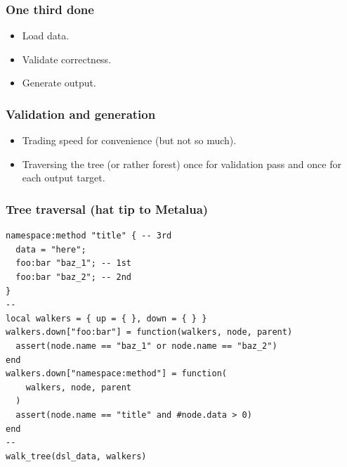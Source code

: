 \documentclass[handout]{beamer}
\begin{document}

\begin{frame}

\frametitle{One third done}

\begin{itemize}
\item[\checkmark] Load data.
\item Validate correctness.
\item Generate output.
\end{itemize}

\end{frame}


\begin{frame}

\frametitle{Validation and generation}

\begin{itemize}
\item Trading speed for convenience (but not so much).
\item Traversing the tree (or rather forest) once for validation pass
      and once for each output target.
\end{itemize}

\end{frame}


\begin{frame}[fragile]

\frametitle{Tree traversal (hat tip to Metalua)}

\begin{verbatim}
namespace:method "title" { -- 3rd
  data = "here";
  foo:bar "baz_1"; -- 1st
  foo:bar "baz_2"; -- 2nd
}
--
local walkers = { up = { }, down = { } }
walkers.down["foo:bar"] = function(walkers, node, parent)
  assert(node.name == "baz_1" or node.name == "baz_2")
end
walkers.down["namespace:method"] = function(
    walkers, node, parent
  )
  assert(node.name == "title" and #node.data > 0)
end
--
walk_tree(dsl_data, walkers)
\end{verbatim}

\end{frame}

\end{document}
